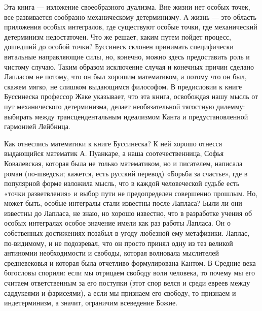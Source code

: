 Эта книга ---  изложение своеобразного дуализма. Вне  жизни нет особых
точек, все  развивается сообразно механическому детерминизму.  А жизнь
--- это  область приложения  особых интегралов, где  существуют особые
точки, где механический детерминизм недостаточен. Что же решает, каким
путем  пойдет процесс,  дошедший  до особой  точки? Буссинеск  склонен
принимать специфически витальные направляющие силы, но, конечно, можно
здесь  предоставить роль  и чистому  случаю. Таким  образом исключение
случая  и конечных  причин  сделано  Лапласом не  потому,  что он  был
хорошим математиком,  а потому  что он был,  скажем мягко,  не слишком
выдающимся философом. В предисловии  к книге Буссинеска профессор Жаке
указывает, что эта  книга, освобождая нашу мысль  от пут механического
детерминизма, делает необязательной  тягостную дилемму: выбирать между
трансцендентальным  идеализмом  Канта  и  предустановленной  гармонией
Лейбница.

Как  отнеслись математики  к книге  Буссинеска? К  ней хорошо  отнесся
выдающийся  математик  А.  Пуанкаре, а  наша  соотечественница,  Софья
Ковалевская,  которая  была не  только  математиком,  но и  писателем,
написала роман (по-шведски; кажется,  есть русский перевод) «Борьба за
счастье»,  где  в  популярной  форме  изложила  мысль,  что  в  каждой
человеческой  судьбе  есть  «точки   разветвления»  и  выбор  пути  не
предопределен  совершенно прошлым.  Но, может  быть, особые  интегралы
стали  известны после  Лапласа? Были  ли они  известны до  Лапласа, не
знаю, но хорошо известно, что в разработке учения об особых интегралах
особое  значение  имели  как  раз работы  Лапласа.  Он  о  собственных
достижениях  позабыл   в  угоду   любезной  ему   метафизики.  Лаплас,
по-видимому, и не подозревал, что он просто принял одну из тез великой
антиномии  необходимости  и   свободы,  которая  волновала  мыслителей
средневековья и которая была отчетливо формулирована Кантом. В Средние
века богословы  спорили: если  мы отрицаем  свободу воли  человека, то
почему мы его считаем ответственным за его поступки (этот спор велся и
среди евреев  между саддукеями  и фарисеями), а  если мы  признаем его
свободу, то  признаем и индетерминизм, а  значит, ограничим всеведение
Божие.

